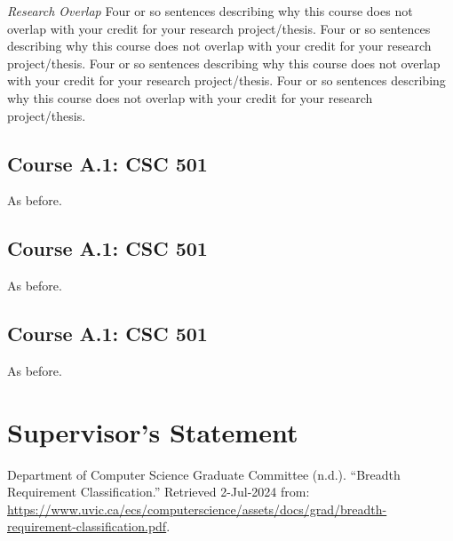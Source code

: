 \documentclass{article}
\begin{document}
\medskip
\noindent
{\em Research Overlap}\hspace{0.5em}
Four or so sentences describing why this course does not overlap with your credit for your research project/thesis.
Four or so sentences describing why this course does not overlap with your credit for your research project/thesis.
Four or so sentences describing why this course does not overlap with your credit for your research project/thesis.
Four or so sentences describing why this course does not overlap with your credit for your research project/thesis.

\subsection{Course A.1: CSC 501}
As before.

\subsection{Course A.1: CSC 501}
As before.

\subsection{Course A.1: CSC 501}
As before.

\section{Supervisor's Statement}
\vspace{15em}


\begin{thebibliography}{1}

 Department of Computer Science Graduate Committee (n.d.). ``Breadth Requirement Classification.'' Retrieved 2-Jul-2024 from: \url{https://www.uvic.ca/ecs/computerscience/assets/docs/grad/breadth-requirement-classification.pdf}.

\end{thebibliography}
\end{document}
